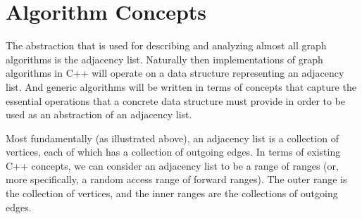



\clearpage
\section{Algorithm Concepts}


The abstraction that is used for describing and analyzing almost all graph algorithms is the adjacency list.  Naturally then implementations of graph algorithms in C++ will operate on a data structure representing an adjacency list.  And generic algorithms will be written in terms of concepts that capture the essential operations that a concrete data structure must provide in order to be used as an abstraction of an adjacency list.

Most fundamentally (as illustrated above), an adjacency list is a collection of vertices, each of which has a collection of outgoing edges.  In terms of existing C++ concepts, we can consider an adjacency list to be a range of ranges (or, more specifically, a random access range of forward ranges).  The outer range is the collection of vertices, and the inner ranges are the collections of outgoing edges.




